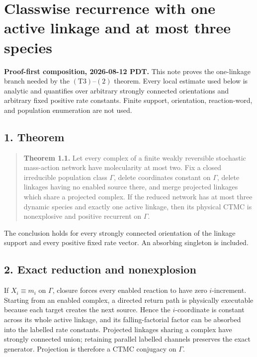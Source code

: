 \section{Classwise recurrence with one active linkage and at most three
species}

\textbf{Proof-first composition, 2026-08-12 PDT.} This note proves the
one-linkage branch needed by the \((\mathrm{T3})\text{--}(2)\) theorem.
Every local estimate used below is analytic and quantifies over
arbitrary strongly connected orientations and arbitrary fixed positive
rate constants. Finite support, orientation, reaction-word, and
population enumeration are not used.

\subsection{1. Theorem}

\begin{quote}
\textbf{Theorem 1.1.} Let every complex of a finite weakly reversible
stochastic mass-action network have molecularity at most two. Fix a
closed irreducible population class \(\Gamma\), delete coordinates
constant on \(\Gamma\), delete linkages having no enabled source there,
and merge projected linkages which share a projected complex. If the
reduced network has at most three dynamic species and exactly one active
linkage, then its physical CTMC is nonexplosive and positive recurrent
on \(\Gamma\).
\end{quote}

The conclusion holds for every strongly connected orientation of the
linkage support and every positive fixed rate vector. An absorbing
singleton is included.

\subsection{2. Exact reduction and
nonexplosion}

If \(X_i\equiv m_i\) on \(\Gamma\), closure forces every enabled
reaction to have zero \(i\)-increment. Starting from an enabled complex,
a directed return path is physically executable because each target
creates the next source. Hence the \(i\)-coordinate is constant across
its whole active linkage, and its falling-factorial factor can be
absorbed into the labelled rate constants. Projected linkages sharing a
complex have strongly connected union; retaining parallel labelled
channels preserves the exact generator. Projection is therefore a CTMC
conjugacy on \(\Gamma\).

